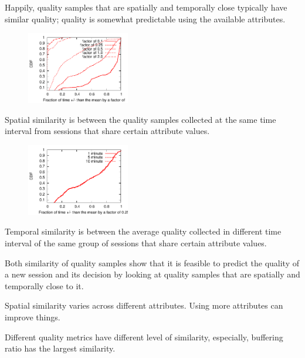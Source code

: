 Happily, quality samples that are spatially and temporally close typically have similar quality; quality is somewhat predictable using the available attributes.

\begin{figure}[h!]
\centering
 \includegraphics[width=0.4\textwidth] {figures/spatial-similarity.pdf}
\label{fig:backend}
\end{figure}

 Spatial similarity is between the quality samples collected at the same time interval from sessions that share certain attribute values. 

\begin{figure}[h!]
\centering
 \includegraphics[width=0.4\textwidth] {figures/temporal-similarity.pdf}
\label{fig:backend}
\end{figure}

 Temporal similarity is between the average quality collected in different time interval of the same group of sessions that share certain attribute values. 

 
\begin{packedenumerate}
	\item Both similarity of quality samples show that it is feasible to predict the quality of a new session and its decision by looking at quality samples that are spatially and temporally close to it.
	\item Spatial similarity varies across different attributes.  Using more attributes can improve things.
	\item Different quality metrics have different level of similarity, especially, buffering ratio has the largest similarity.
\end{packedenumerate}

